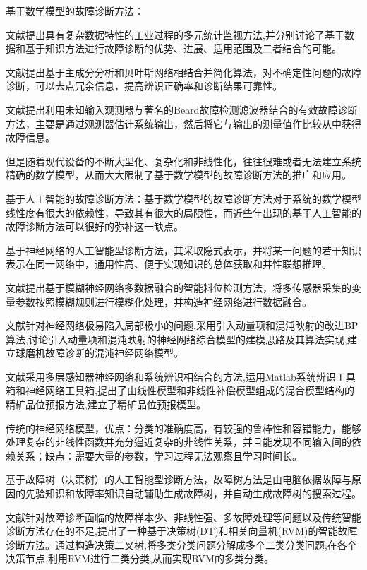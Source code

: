 \documentclass{ctacn}%
\begin{document}
\begin{multicols}{2}
基于数学模型的故障诊断方法：

文献\cite{刘强2010基于数据和知识的工业过程监视及故障诊断综述}提出具有复杂数据特性的工业过程的多元统计监视方法,并分别讨论了基于数据和基于知识方法进行故障诊断的优势、进展、适用范围及二者结合的可能。

文献\cite{李勇2006磨矿过程参数软测量与综合优化控制的研究}提出基于主成分分析和贝叶斯网络相结合并简化算法，对不确定性问题的故障诊断，可以去点冗余信息，提高辨识正确率和诊断结果可靠性。

文献\cite{darby2011rto}提出利用未知输入观测器与著名的Beard故障检测滤波器结合的有效故障诊断方法，主要是通过观测器估计系统输出，然后将它与输出的测量值作比较从中获得故障信息。

但是随着现代设备的不断大型化、复杂化和非线性化，往往很难或者无法建立系统精确的数学模型，从而大大限制了基于数学模型的故障诊断方法的推广和应用。

基于人工智能的故障诊断方法：基于数学模型的故障诊断方法对于系统的数学模型线性度有很大的依赖性，导致其有很大的局限性，而近些年出现的基于人工智能的故障诊断方法可以很好的弥补这一缺点。

基于神经网络的人工智能型诊断方法，其采取隐式表示，并将某一问题的若干知识表示在同一网络中，通用性高、便于实现知识的总体获取和并性联想推理。

文献\cite{scattolini2009architectures}提出基于模糊神经网络多数据融合的智能料位检测方法，将多传感器采集的变量参数按照模糊规则进行模糊化处理，并构造神经网络进行数据融合。

文献\cite{ranaee2010application}针对神经网络极易陷入局部极小的问题,采用引入动量项和混沌映射的改进BP算法,讨论引入动量项和混沌映射的神经网络综合模型的建模思路及其算法实现,建立球磨机故障诊断的混沌神经网络模型。

文献\cite{garrido2011extended}采用多层感知器神经网络和系统辨识相结合的方法,运用Matlab系统辨识工具箱和神经网络工具箱,提出了由线性模型和非线性补偿模型组成的混合模型结构的精矿品位预报方法,建立了精矿品位预报模型。

传统的神经网络模型，优点：分类的准确度高，有较强的鲁棒性和容错能力，能够处理复杂的非线性函数并充分逼近复杂的非线性关系，并且能发现不同输入间的依赖关系；缺点：需要大量的参数，学习过程无法观察且学习时间长。

基于故障树（决策树）的人工智能型诊断方法，故障树方法是由电脑依据故障与原因的先验知识和故障率知识自动辅助生成故障树，并自动生成故障树的搜索过程。

文献\cite{dazhi2011research}针对故障诊断面临的故障样本少、非线性强、多故障处理等问题以及传统智能诊断方法存在的不足,提出了一种基于决策树(DT)和相关向量机(RVM)的智能故障诊断方法。通过构造决策二叉树,将多类分类问题分解成多个二类分类问题;在各个决策节点,利用RVM进行二类分类,从而实现RVM的多类分类。


\end{multicols}
\end{document}
